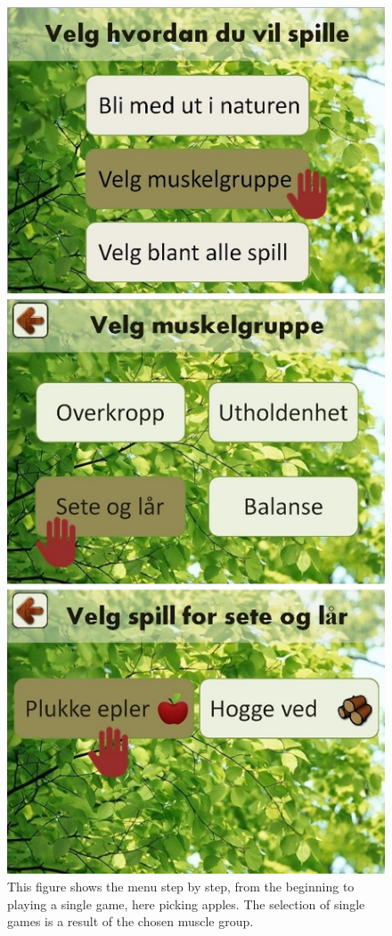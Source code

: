 \begin{figure} [ht!]
\centering
\includegraphics[scale=0.5]{menuStep1.jpg}
\caption[The menu, part one]{This figure shows the menu step by step, from the beginning to playing a single game, here picking apples. The selection of single games is a result of the chosen muscle group.}
\label{menu1}
\end{figure}

